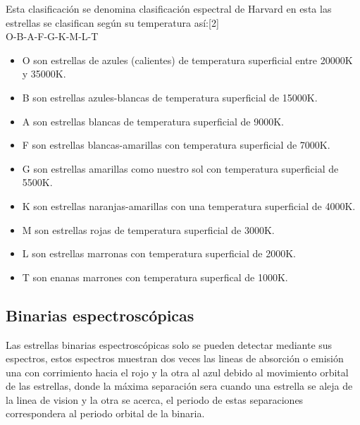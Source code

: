 \documentclass[Proceedings]{ascelike}
\begin{document}
Esta clasificaci\'on se denomina clasificaci\'on espectral de Harvard en esta las estrellas se clasifican seg\'un su temperatura as\'i:[2]\\

O-B-A-F-G-K-M-L-T\\

\begin{itemize}

\item O son estrellas de azules (calientes) de temperatura superficial entre 20000K y 35000K.\\
\item B son estrellas azules-blancas de temperatura superficial de 15000K.\\
\item A son estrellas blancas de temperatura superficial de 9000K.\\
\item F son estrellas blancas-amarillas con temperatura superficial de 7000K.\\
\item G son estrellas amarillas como nuestro sol con temperatura superficial de 5500K.\\
\item K son estrellas naranjas-amarillas con una temperatura superficial de 4000K.\\
\item M son estrellas rojas de temperatura superficial de 3000K.\\
\item L son estrellas marronas con temperatura superficial de 2000K.\\
\item T son enanas marrones con temperatura superfical de 1000K.\\
\end{itemize}


\subsection{Binarias espectrosc\'opicas}

Las estrellas binarias espectrosc\'opicas solo se pueden detectar mediante sus espectros, estos espectros muestran dos veces las lineas de absorci\'on o emisi\'on una con corrimiento hacia 
el rojo y la otra al azul debido al movimiento orbital de las estrellas, donde la m\'axima separaci\'on sera cuando una estrella se aleja de la
linea de vision y la otra se acerca, el periodo de estas separaciones correspondera al periodo
orbital de la binaria.
\end{document}
